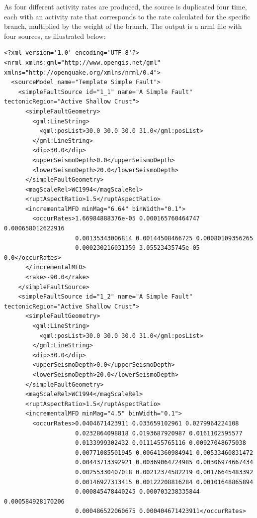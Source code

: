 As four different activity rates are produced, the source is duplicated four time, each with an activity rate that corresponds to the rate calculated for the specific branch, multiplied by the weight of the branch. The output is a nrml file with four sources, as illustrated below:

\begin{Verbatim}[frame=single, commandchars=\\\{\}, fontsize=\scriptsize]
<?xml version='1.0' encoding='UTF-8'?>
<nrml xmlns:gml="http://www.opengis.net/gml" xmlns="http://openquake.org/xmlns/nrml/0.4">
  <sourceModel name="Template Simple Fault">
    <simpleFaultSource id="1_1" name="A Simple Fault" tectonicRegion="Active Shallow Crust">
      <simpleFaultGeometry>
        <gml:LineString>
          <gml:posList>30.0 30.0 30.0 31.0</gml:posList>
        </gml:LineString>
        <dip>30.0</dip>
        <upperSeismoDepth>0.0</upperSeismoDepth>
        <lowerSeismoDepth>20.0</lowerSeismoDepth>
      </simpleFaultGeometry>
      <magScaleRel>WC1994</magScaleRel>
      <ruptAspectRatio>1.5</ruptAspectRatio>
      <incrementalMFD minMag="6.64" binWidth="0.1">
        <occurRates>1.66984888376e-05 0.000165760464747 0.000658012622916 
                    0.00135343006814 0.00144508466725 0.00080109356265 
                    0.000230216031359 3.05523435745e-05 0.0</occurRates>
      </incrementalMFD>
      <rake>-90.0</rake>
    </simpleFaultSource>
    <simpleFaultSource id="1_2" name="A Simple Fault" tectonicRegion="Active Shallow Crust">
      <simpleFaultGeometry>
        <gml:LineString>
          <gml:posList>30.0 30.0 30.0 31.0</gml:posList>
        </gml:LineString>
        <dip>30.0</dip>
        <upperSeismoDepth>0.0</upperSeismoDepth>
        <lowerSeismoDepth>20.0</lowerSeismoDepth>
      </simpleFaultGeometry>
      <magScaleRel>WC1994</magScaleRel>
      <ruptAspectRatio>1.5</ruptAspectRatio>
      <incrementalMFD minMag="4.5" binWidth="0.1">
        <occurRates>0.0404671423911 0.033659102961 0.0279964224108 
                    0.0232864098818 0.0193687920987 0.0161102595577 
                    0.0133999302432 0.0111455765116 0.00927048675038
                    0.00771085501945 0.00641360984941 0.00533460831472
                    0.00443713392921 0.00369064724985 0.00306974667434
                    0.00255330407018 0.00212374582219 0.00176645483392
                    0.00146927313415 0.00122208816284 0.00101648865894
                    0.000845478440245 0.000703238335844 0.000584928170206
                    0.000486522060675 0.000404671423911</occurRates>

\end{Verbatim}
